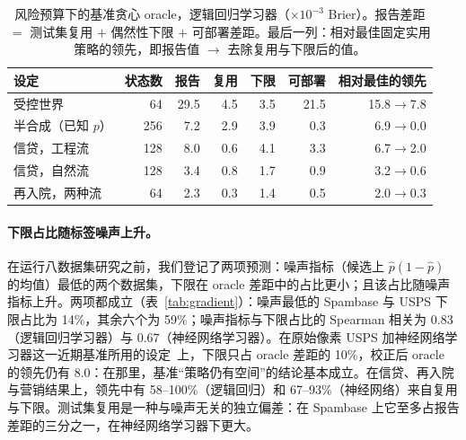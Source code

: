 \documentclass[runningheads]{llncs}
\begin{document}
\begin{table}[t]
\caption{风险预算下的基准贪心 oracle，逻辑回归学习器（$\times10^{-3}$ Brier）。报告差距 $=$ 测试集复用 $+$ 偶然性下限 $+$ 可部署差距。最后一列：相对最佳固定实用策略的领先，即报告值 $\to$ 去除复用与下限后的值。}
\label{tab:known}
\centering\scriptsize
\setlength{\tabcolsep}{3.5pt}
\begin{tabular}{lrrrrrr}
\toprule
设定 & 状态数 & 报告 & 复用 & 下限 & 可部署 & 相对最佳的领先 \\
\midrule
受控世界 & 64 & 29.5 & 4.5 & 3.5 & 21.5 & 15.8$\to$7.8 \\
半合成（已知 $p$） & 256 & 7.2 & 2.9 & 3.9 & 0.3 & 6.9$\to$0.0 \\
信贷，工程流 & 128 & 8.0 & 0.6 & 4.1 & 3.3 & 6.7$\to$2.0 \\
信贷，自然流 & 128 & 3.4 & 0.8 & 1.7 & 0.9 & 3.2$\to$0.6 \\
再入院，两种流 & 64 & 2.3 & 0.3 & 1.4 & 0.5 & 2.0$\to$0.3 \\
\bottomrule
\end{tabular}
\end{table}

\paragraph{下限占比随标签噪声上升。}在运行八数据集研究之前，我们登记了两项预测：噪声指标（候选上 $\hat p(1-\hat p)$ 的均值）最低的两个数据集，下限在 oracle 差距中的占比更小；且该占比随噪声指标上升。两项都成立（表~\ref{tab:gradient}）：噪声最低的 Spambase 与 USPS 下限占比为 14\%，其余六个为 59\%；噪声指标与下限占比的 Spearman 相关为 $0.83$（逻辑回归学习器）与 $0.67$（神经网络学习器）。在原始像素 USPS 加神经网络学习器这一近期基准所用的设定~\cite{werner2024cdalbench}上，下限只占 oracle 差距的 10\%，校正后 oracle 的领先仍有 $8.0$：在那里，基准“策略仍有空间”的结论基本成立。在信贷、再入院与营销结果上，领先中有 58--100\%（逻辑回归）和 67--93\%（神经网络）来自复用与下限。测试集复用是一种与噪声无关的独立偏差：在 Spambase 上它至多占报告差距的三分之一，在神经网络学习器下更大。
\end{document}
